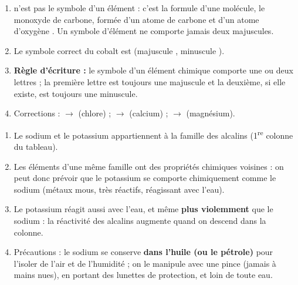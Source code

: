 \documentclass[11pt]{article}
\newcommand{\cle}[1]{{\popxbold\color{popdark}#1}}
\begin{document}
\begin{corrige}
\begin{enumerate}
\item {} n'est pas le symbole d'un élément : c'est la formule d'une \cle{molécule}, le monoxyde de carbone, formée d'un atome de carbone  et d'un atome d'oxygène . Un symbole d'élément ne comporte jamais deux majuscules.
\item Le symbole correct du cobalt est  (majuscule , minuscule ).
\item \textbf{Règle d'écriture :} le symbole d'un élément chimique comporte une ou deux lettres ; la première lettre est toujours une \cle{majuscule} et la deuxième, si elle existe, est toujours une \cle{minuscule}.
\item Corrections :  $\rightarrow$  (chlore) ;  $\rightarrow$  (calcium) ;  $\rightarrow$  (magnésium).
\end{enumerate}
\end{corrige}

\begin{corrige}
\begin{enumerate}
\item Le sodium et le potassium appartiennent à la famille des \cle{alcalins} (1\textsuperscript{re} colonne du tableau).
\item Les éléments d'une même famille ont des propriétés chimiques voisines : on peut donc prévoir que le potassium se comporte chimiquement comme le sodium (métaux mous, très réactifs, réagissant avec l'eau).
\item Le potassium réagit aussi avec l'eau, et même \textbf{plus violemment} que le sodium : la réactivité des alcalins augmente quand on descend dans la colonne.
\item Précautions : le sodium se conserve \textbf{dans l'huile (ou le pétrole)} pour l'isoler de l'air et de l'humidité ; on le manipule avec une pince (jamais à mains nues), en portant des lunettes de protection, et loin de toute eau.
\end{enumerate}
\end{corrige}
\end{document}
